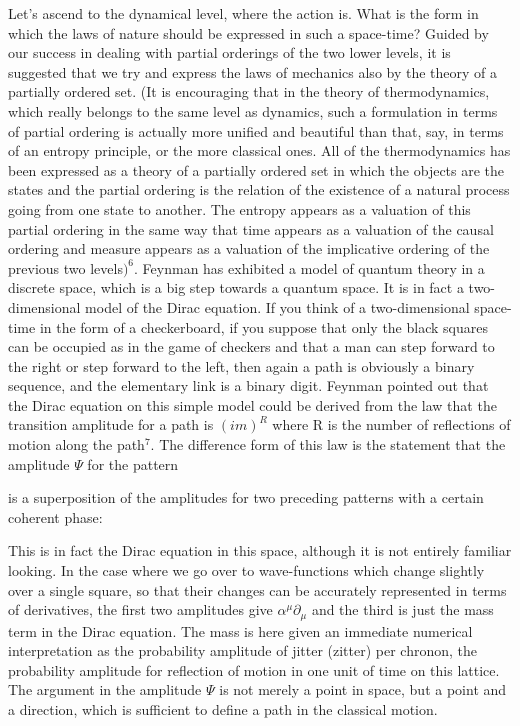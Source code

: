 Let's ascend to the dynamical level, where the action is. What is the form in
which the laws of nature should be expressed in such a space-time? Guided by our
success in dealing with partial orderings of the two lower levels, it is
suggested that we try and express the laws of mechanics also by the theory of a
partially ordered set. (It is encouraging that in the theory of thermodynamics,
which really belongs to the same level as dynamics, such a formulation in terms
of partial ordering is actually more unified and beautiful than that, say, in
terms of an entropy principle, or the more classical ones. All of the
thermodynamics has been expressed as a theory of a partially ordered set in which
the objects are the states and the partial ordering is the relation of the
existence of a natural process going from one state to another. The entropy
appears as a valuation of this partial ordering in the same way that time appears
as a valuation of the causal ordering and measure appears as a valuation of the
implicative ordering of the previous two levels$)^6$. Feynman has exhibited a
model of quantum theory in a discrete space, which is a big step towards a
quantum space. It is in fact a two-dimensional model of the Dirac equation. If
you think of a two-dimensional space-time in the form of a checkerboard, if you
suppose that only the black squares can be occupied as in the game of checkers
and that a man can step forward to the right or step forward to the left, then
again a path is obviously a binary sequence, and the elementary link is a binary
digit. Feynman pointed out that the Dirac equation on this simple model could be
derived from the law that the transition amplitude for a path is $(im)^R$ where R is
the number of reflections of motion along the path$^7$. The difference form of
this law is the statement that the amplitude $\Psi$ for the pattern

\bigskip\bigskip

is a superposition of the amplitudes for two preceding patterns with a certain
coherent phase:

\bigskip\bigskip

This is in fact the Dirac equation in this space, although it is not entirely
familiar looking. In the case where we go over to wave-functions which change
slightly over a single square, so that their changes can be accurately
represented in terms of derivatives, the first two amplitudes give
\(
\alpha^\mu\partial_\mu
\)
and the third is just the mass term in the Dirac equation. The mass is here given
an immediate numerical interpretation as the probability amplitude of jitter
(zitter) per chronon, the probability amplitude for reflection of motion in one
unit of time on this lattice. The argument in the amplitude $\Psi$ is not merely a
point in space, but a point and a direction, which is sufficient to define a path
in the classical motion.

